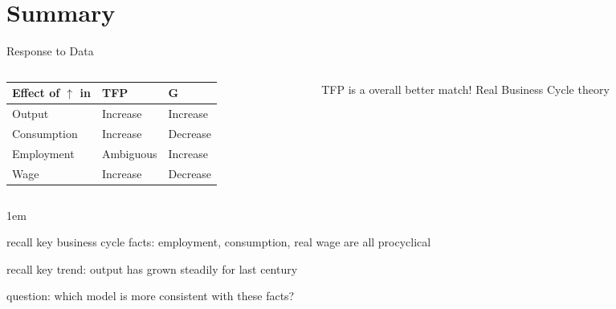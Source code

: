 \documentclass[11pt,aspectratio=43]{beamer}
\let\olditemize=\itemize
\let\endolditemize=\enditemize
\renewenvironment{itemize}{\olditemize \itemsep1em}{\endolditemize}
\theoremstyle{definition}
\begin{document}
\section{Summary}
\label{sec:Summary}

\begin{frame}{Response to Data}
\label{slide:Response_to_Data}
    \begin{columns}
        \begin{column}{0.7\textwidth}
            \begin{tabular}{l|l|l}
                Effect of $\uparrow$ in & TFP       & G        \\
                \hline
                \hline
                Output                  & Increase  & Increase \\
                \hline
                Consumption             & Increase  & Decrease \\
                \hline
                Employment              & Ambiguous & Increase \\
                \hline
                Wage                    & Increase  & Decrease
            \end{tabular}
        \end{column}
        \begin{column}{0.3\textwidth}
            TFP is a overall better match!
            \alert{Real Business Cycle} theory
        \end{column}
    \end{columns}
    \begin{itemize}
        \item recall key \alert{business cycle facts}: employment, consumption, real wage are all procyclical
        \item recall key \alert{trend}: output has grown steadily for last century
        \item question: which model is more consistent with these facts?
    \end{itemize}
\end{frame}
\end{document}
